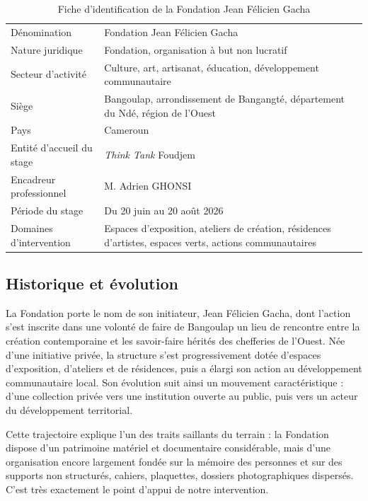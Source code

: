 \begin{table}[htbp]
\centering
\caption{Fiche d'identification de la Fondation Jean Félicien Gacha}
\label{tab:fiche}
\small
\begin{tabularx}{\textwidth}{|L{5.2cm}|X|}
\hline
{}
 &  \\ \hline
Dénomination & Fondation Jean Félicien Gacha \\ \hline
Nature juridique & Fondation, organisation à but non lucratif \\ \hline
Secteur d'activité & Culture, art, artisanat, éducation, développement communautaire \\ \hline
Siège & Bangoulap, arrondissement de Bangangté, département du Ndé, région de l'Ouest \\ \hline
Pays & Cameroun \\ \hline
Entité d'accueil du stage & \emph{Think Tank} Foudjem \\ \hline
Encadreur professionnel & M. Adrien GHONSI \\ \hline
Période du stage & Du 20 juin au 20 août 2026 \\ \hline
Domaines d'intervention & Espaces d'exposition, ateliers de création, résidences d'artistes, espaces verts, actions communautaires \\ \hline
\end{tabularx}
\end{table}


\subsection{Historique et évolution}

La Fondation porte le nom de son initiateur, Jean Félicien Gacha, dont l'action
s'est inscrite dans une volonté de faire de Bangoulap un lieu de rencontre entre
la création contemporaine et les savoir-faire hérités des chefferies de l'Ouest.
Née d'une initiative privée, la structure s'est progressivement dotée d'espaces
d'exposition, d'ateliers et de résidences, puis a élargi son action au
développement communautaire local. Son évolution suit ainsi un mouvement
caractéristique : d'une collection privée vers une institution ouverte au
public, puis vers un acteur du développement territorial.

Cette trajectoire explique l'un des traits saillants du terrain : la Fondation
dispose d'un patrimoine matériel et documentaire considérable, mais d'une
organisation encore largement fondée sur la mémoire des personnes et sur des
supports non structurés, cahiers, plaquettes, dossiers photographiques
dispersés. C'est très exactement le point d'appui de notre intervention.

